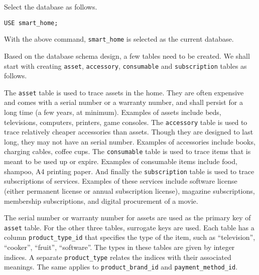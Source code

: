 Select the database as follows.
\begin{lstlisting}
USE smart_home;
\end{lstlisting}
With the above command, \verb|smart_home| is selected as the current database.

Based on the database schema design, a few tables need to be created. We shall start with creating \verb|asset|, \verb|accessory|, \verb|consumable| and \verb|subscription| tables as follows.

The \verb|asset| table is used to trace assets in the home. They are often expensive and comes with a serial number or a warranty number, and shall persist for a long time (a few years, at minimum). Examples of assets include beds, televisions, computers, printers, game consoles. The \verb|accessory| table is used to trace relatively cheaper accessories than assets. Though they are designed to last long, they may not have an serial number. Examples of accessories include books, charging cables, coffee cups. The \verb|consumable| table is used to trace items that is meant to be used up or expire. Examples of consumable items include food, shampoo, A4 printing paper. And finally the \verb|subscription| table is used to trace subscriptions of services. Examples of these services include software license (either permanent license or annual subscription license), magazine subscriptions, membership subscriptions, and digital procurement of a movie.

The serial number or warranty number for assets are used as the primary key of \verb|asset| table. For the other three tables, surrogate keys are used. Each table has a column \verb|product_type_id| that specifies the type of the item, such as ``television'', ``cooker'', ``fruit'', ``software''. The types in these tables are given by integer indices. A separate \verb|product_type| relates the indices with their associated meanings. The same applies to \verb|product_brand_id| and \verb|payment_method_id|.

